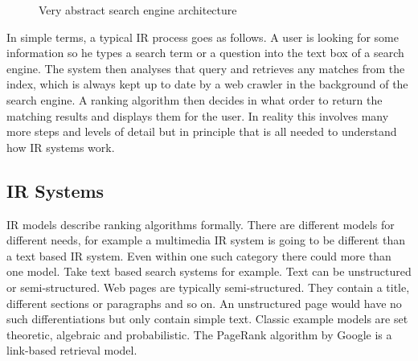 \begin{figure}[htb]
  \centering
\caption[Search Engine Architecture]{Very abstract search engine architecture}
\label{fig:SEA}
\end{figure}

In simple terms, a typical IR process goes as follows. A user is looking for some information so he types a search term or a question into the text box of a search engine. The system then analyses that query and retrieves any matches from the index, which is always kept up to date by a web crawler in the background of the search engine. A ranking algorithm then decides in what order to return the matching results and displays them for the user. In reality this involves many more steps and levels of detail but in principle that is all needed to understand how IR systems work.

\subsection{IR Systems}

IR models describe ranking algorithms formally. There are different models for different needs, for example a multimedia IR system is going to be different than a text based IR system. Even within one such category there could more than one model. Take text based search systems for example. Text can be unstructured or semi-structured. Web pages are typically semi-structured. They contain a title, different sections or paragraphs and so on. An unstructured page would have no such differentiations but only contain simple text.  Classic example models are set theoretic, algebraic and probabilistic. The PageRank algorithm by Google is a link-based retrieval model.

